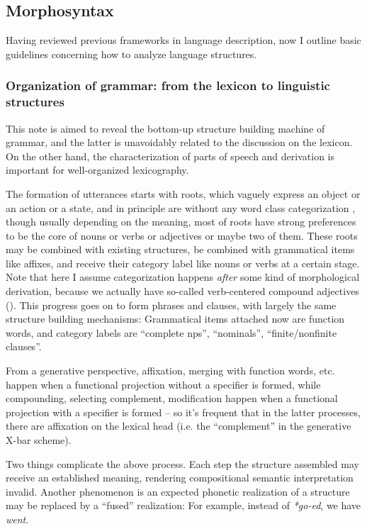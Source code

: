 \documentclass[UTF8, a4paper, oneside, scheme=plain]{ctexrep}
\newcommand*{\citepage}[1]{p.~{#1}}
\newcommand{\corpus}[1]{\emph{#1}}
\begin{document}
\subsection{Morphosyntax}

Having reviewed previous frameworks in language description,
now I outline basic guidelines concerning how to analyze language structures.

\subsubsection{Organization of grammar: from the lexicon to linguistic structures}\label{sec:orgianization-of-grammar}

This note is aimed to reveal the bottom-up structure building machine of grammar,
and the latter is unavoidably related to the discussion on the lexicon.
On the other hand,
the characterization of parts of speech and derivation is important for well-organized lexicography.

The formation of utterances starts with roots, 
which vaguely express an object or an action or a state,
and in principle are without any word class categorization 
\citep[\citepage{13}]{greenough2013allen},
though usually depending on the meaning,
most of roots have strong preferences to be the core of nouns or verbs or adjectives or maybe two of them.
These roots may be combined with existing structures,
be combined with grammatical items like affixes,
and receive their category label like nouns or verbs at a certain stage.
Note that here I assume categorization happens \emph{after} some kind of morphological derivation,
because we actually have so-called verb-centered compound adjectives
().
This progress goes on to form phrases and clauses,
with largely the same structure building mechanisms:
Grammatical items attached now are function words,
and category labels are ``complete \acs{np}s'', ``nominals'', ``finite/nonfinite clauses''.

From a generative perspective, 
affixation, merging with function words, etc. 
happen when a functional projection without a specifier is formed,
while compounding, selecting complement, modification 
happen when a functional projection with a specifier is formed
-- so it's frequent that in the latter processes,
there are affixation on the lexical head (i.e. the ``complement'' in the generative X-bar scheme).

Two things complicate the above process. 
Each step the structure assembled may receive an established meaning,
rendering compositional semantic interpretation invalid.
Another phenomenon is 
an expected phonetic realization of a structure 
may be replaced by a ``fused'' realization:
For example, instead of \corpus{*go-ed}, we have \corpus{went}.
\end{document}
